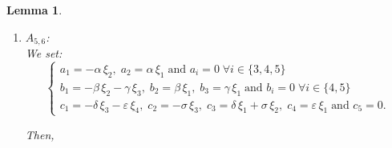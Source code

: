\documentclass[10pt]{article}
\newtheorem{Lemma}{Lemma}
\begin{document}
\begin{Lemma}
\begin{enumerate}
\begin{enumerate}
\item For $k\in\{3,4,5\}$,
\begin{equation*}(\mathscr{L}_\xi\nabla)(v_k,v_4)=0,\quad \forall k\in\{3,4,5\}. \end{equation*}

\item For $k\in\{1,2\}$,
\begin{equation*} (\mathscr{L}_\xi\nabla)(v_k,v_4)=\begin{cases} 
-\tfrac{1}{2}\gamma(\alpha\xi_1v_3+\gamma\xi_1v_4) & k=1\\ 
\tfrac{1}{2}\gamma(-\alpha\xi_2v_3-\gamma\xi_2v_4-\beta\xi_3v_5)& k=2.
\end{cases} \end{equation*}

\item For $k\in \{1,2,3,4,5\}$, 
\begin{equation*} (\mathscr{L}_\xi\nabla)(v_k,v_5)=\begin{cases} 
\tfrac{1}{2}(\alpha\beta\xi_2v_1-\beta^2\xi_1v_5) & k=1\\ 
-\tfrac{1}{2}\alpha\beta\xi_1v_1& k=2 \\ 
-\tfrac{1}{2}(\alpha\beta\xi_2v_3+\beta\gamma\xi_2 v_4+\beta^2\xi_3v_5) & k=3\\ 
0 & k=5.
\end{cases} \end{equation*}
\end{enumerate}
  \item \(A_{5,6}\):\\

  We set:
\[\begin{cases} 
a_1=-\alpha\,\xi_2,\; 
a_2=\alpha\,\xi_1\; \text{and $a_i=0$}\; \forall i\in \{3,4,5\}\\ 
b_1=-\beta\,\xi_2 - \gamma\,\xi_3,\; 
b_2=\beta\,\xi_1, \; b_3=\gamma\,\xi_1\; \text{and $b_i=0$}\; \forall i\in \{4,5\}\\ 
c_1=-\delta\,\xi_3 - \varepsilon\,\xi_4,\; 
c_2=-\sigma\,\xi_3, \; c_3=\delta\,\xi_1 + \sigma\,\xi_2,\; c_4=\varepsilon\,\xi_1\; \text{and $c_5=0$.}
\end{cases}\]

Then,


\end{enumerate}
\end{Lemma}
\end{document}
